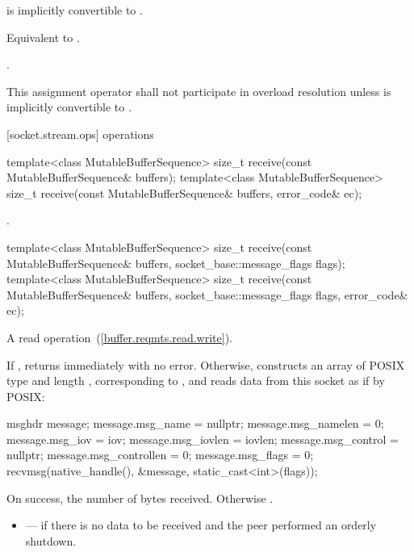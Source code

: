 \begin{itemdescr}
\pnum
\requires {} is implicitly convertible to .

\pnum
\effects Equivalent to .

\pnum
\returns {}.

\pnum
\remarks This assignment operator shall not participate in overload resolution unless  is implicitly convertible to .
\end{itemdescr}



[socket.stream.ops]{ operations}

\begin{itemdecl}
template<class MutableBufferSequence>
  size_t receive(const MutableBufferSequence& buffers);
template<class MutableBufferSequence>
  size_t receive(const MutableBufferSequence& buffers,
                 error_code& ec);
\end{itemdecl}

\begin{itemdescr}
\pnum
\returns {}.
\end{itemdescr}

\begin{itemdecl}
template<class MutableBufferSequence>
  size_t receive(const MutableBufferSequence& buffers,
                 socket_base::message_flags flags);
template<class MutableBufferSequence>
  size_t receive(const MutableBufferSequence& buffers,
                 socket_base::message_flags flags, error_code& ec);
\end{itemdecl}

\begin{itemdescr}
\pnum
A read operation~(\ref{buffer.reqmts.read.write}).

\pnum
\effects If , returns immediately with no error. Otherwise, constructs an array  of POSIX type  and length , corresponding to , and reads data from this socket as if by POSIX: 
\begin{codeblock}
msghdr message;
message.msg_name = nullptr;
message.msg_namelen = 0;
message.msg_iov = iov;
message.msg_iovlen = iovlen;
message.msg_control = nullptr;
message.msg_controllen = 0;
message.msg_flags = 0;
recvmsg(native_handle(), &message, static_cast<int>(flags));
\end{codeblock}


\pnum
\returns On success, the number of bytes received. Otherwise .

\pnum
\errors
\begin{itemize}
\item
{} --- if there is no data to be received and the peer performed an orderly shutdown.
\end{itemize}
\end{itemdescr}

